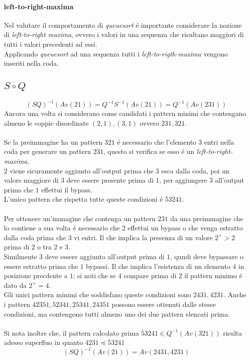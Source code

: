 \paragraph*{left-to-right-maxima}Nel valutare il comportamento di \textit{queuesort} \'e importante considerare la nozione di \textit{left-to-right maxima}, ovvero i valori in una sequenza che risultano maggiori di tutti i valori precedenti ad essi.\\Applicando \textit{queuesort} ad una sequenza tutti i \textit{left-to-rigth-maxima} vengono inseriti nella coda.
\subsection*{$S\circ{Q}$}$$(SQ)^{-1}(Av(21))=Q^{-1}S^{-1}(Av(21))=Q^{-1}(Av(231))$$Ancora una volta si considerano come candidati i pattern minimi che contengano almeno le coppie disordinate $(2,1),(3,1)$ ovvero $231,321$.\\\\
Se la preimmagine ha un pattern $321$ \'e necessario che l'elemento $3$ entri nella coda per generare un pattern $231$, questo si verifica se esso \'e un \textit{left-to-right-maxima}.\\$2$ viene sicuramente aggiunto all'output prima che $3$ esca dalla coda, poi un valore maggiore di $3$ deve essere presente prima di $1$, per aggiungere $3$ all'output prima che $1$ effettui il bypass.\\
L'unico pattern che rispetta tutte queste condizioni \'e $\overline{5}3241$.\\\\
Per ottenere un'immagine che contenga un pattern $231$ da una preimmagine che lo contiene a sua volta \'e necessario che $2$ effettui un bypass o che venga estratto dalla coda prima che $3$ vi entri. Il che implica la presenza di un valore $2^+>2$ prima di $2$ o tra $2$ e $3$.\\Similmente $3$ deve essere aggiunto all'output prima di $1$, qundi deve bypassare o essere estratto prima che $1$ bypassi. Il che implica l'esistenza di un elemento $4$ in posizione precdente a $1$; si noti che se $4$ compare prima di $2$ il pattern minimo \'e dato da $2^+=4$.\\
Gli unici pattern minimi che soddisfano queste condizioni sono $2431,4231$. Anche i pattern $42351,52341,25341,24351$ possono essere ottenuti dalle stesse condizioni, ma contengono tutti almeno uno dei due pattern elencati prima.
\\\\Si nota inoltre che, il pattern calcolato prima $\overline{5}3241\in Q^{-1}(Av(321))$ risulta adesso superfluo in quanto $4231\preceq\overline{5}3241$
$$(SQ)^{-1}(Av(21))=Av(2431,4231)$$
